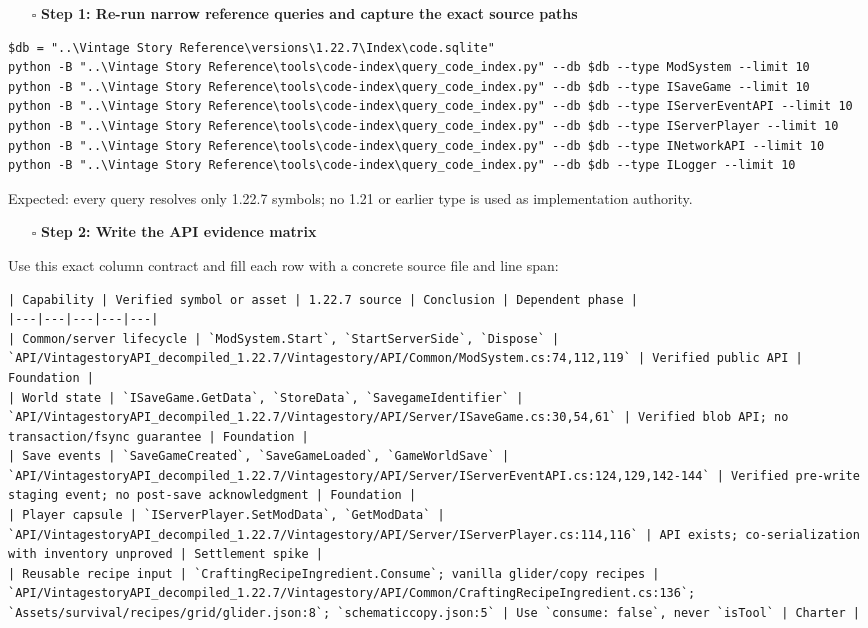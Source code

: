 \documentclass[
  10pt,
  letterpaper,
]{article}
\providecommand{\tightlist}{%
  \setlength{\itemsep}{0pt}\setlength{\parskip}{0pt}}
\begin{document}
\begin{itemize}
\tightlist
\item[$\square$]
  \textbf{Step 1: Re-run narrow reference queries and capture the exact
  source paths}
\end{itemize}

\begin{lstlisting}
$db = "..\Vintage Story Reference\versions\1.22.7\Index\code.sqlite"
python -B "..\Vintage Story Reference\tools\code-index\query_code_index.py" --db $db --type ModSystem --limit 10
python -B "..\Vintage Story Reference\tools\code-index\query_code_index.py" --db $db --type ISaveGame --limit 10
python -B "..\Vintage Story Reference\tools\code-index\query_code_index.py" --db $db --type IServerEventAPI --limit 10
python -B "..\Vintage Story Reference\tools\code-index\query_code_index.py" --db $db --type IServerPlayer --limit 10
python -B "..\Vintage Story Reference\tools\code-index\query_code_index.py" --db $db --type INetworkAPI --limit 10
python -B "..\Vintage Story Reference\tools\code-index\query_code_index.py" --db $db --type ILogger --limit 10
\end{lstlisting}

Expected: every query resolves only 1.22.7 symbols; no 1.21 or earlier
type is used as implementation authority.

\begin{itemize}
\tightlist
\item[$\square$]
  \textbf{Step 2: Write the API evidence matrix}
\end{itemize}

Use this exact column contract and fill each row with a concrete source
file and line span:

\begin{lstlisting}
| Capability | Verified symbol or asset | 1.22.7 source | Conclusion | Dependent phase |
|---|---|---|---|---|
| Common/server lifecycle | `ModSystem.Start`, `StartServerSide`, `Dispose` | `API/VintagestoryAPI_decompiled_1.22.7/Vintagestory/API/Common/ModSystem.cs:74,112,119` | Verified public API | Foundation |
| World state | `ISaveGame.GetData`, `StoreData`, `SavegameIdentifier` | `API/VintagestoryAPI_decompiled_1.22.7/Vintagestory/API/Server/ISaveGame.cs:30,54,61` | Verified blob API; no transaction/fsync guarantee | Foundation |
| Save events | `SaveGameCreated`, `SaveGameLoaded`, `GameWorldSave` | `API/VintagestoryAPI_decompiled_1.22.7/Vintagestory/API/Server/IServerEventAPI.cs:124,129,142-144` | Verified pre-write staging event; no post-save acknowledgment | Foundation |
| Player capsule | `IServerPlayer.SetModData`, `GetModData` | `API/VintagestoryAPI_decompiled_1.22.7/Vintagestory/API/Server/IServerPlayer.cs:114,116` | API exists; co-serialization with inventory unproved | Settlement spike |
| Reusable recipe input | `CraftingRecipeIngredient.Consume`; vanilla glider/copy recipes | `API/VintagestoryAPI_decompiled_1.22.7/Vintagestory/API/Common/CraftingRecipeIngredient.cs:136`; `Assets/survival/recipes/grid/glider.json:8`; `schematiccopy.json:5` | Use `consume: false`, never `isTool` | Charter |
\end{lstlisting}
\end{document}
